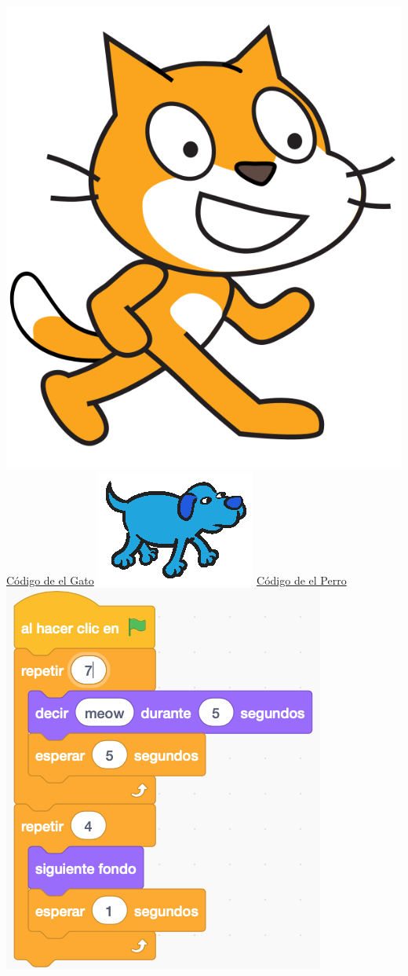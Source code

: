 \documentclass[letterpaper,12pt]{article}
\begin{document}
\indent \includegraphics[scale=.25,valign=c]{cat.png} \underline{Código de el Gato} \hspace{5cm}
\includegraphics[scale=.2,valign=c]{dog.png} \underline{Código de el Perro} \\
\includegraphics[scale=.8,valign=t]{q6_script0.png} \hspace{1cm}
\end{document}
